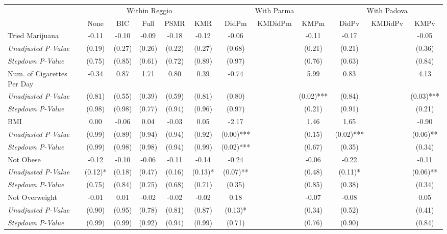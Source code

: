 \begin{tabular}{l c c c c c c c c c c c}
\toprule
& \multicolumn{5}{c}{Within Reggio} & \multicolumn{3}{c}{With Parma} & \multicolumn{3}{c}{With Padova} \\\cmidrule(lr){2-6} \cmidrule(lr){7-9} \cmidrule(lr){10-12}
 & None & BIC & Full & PSMR & KMR & DidPm & KMDidPm & KMPm & DidPv & KMDidPv & KMPv \\
\midrule
Tried Marijuana & -0.11 & -0.10 & -0.09 & -0.18 & -0.12 & -0.06 & & -0.11 & -0.17 & & -0.05 \\
\quad \textit{Unadjusted P-Value} & (0.19) & (0.27) & (0.26) & (0.22) & (0.27) & (0.68) & & (0.21) & (0.21) & & (0.36) \\
\quad \textit{Stepdown P-Value} & (0.75) & (0.85) & (0.61) & (0.72) & (0.89) & (0.97) & & (0.76) & (0.63) & & (0.84) \\
Num. of Cigarettes Per Day & -0.34 & 0.87 & 1.71 & 0.80 & 0.39 & -0.74 & & 5.99 & 0.83 & & 4.13 \\
\quad \textit{Unadjusted P-Value} & (0.81) & (0.55) & (0.39) & (0.59) & (0.81) & (0.80) & & (0.02)*** & (0.84) & & (0.03)*** \\
\quad \textit{Stepdown P-Value} & (0.98) & (0.98) & (0.77) & (0.94) & (0.96) & (0.97) & & (0.21) & (0.91) & & (0.21) \\
BMI & 0.00 & -0.06 & 0.04 & -0.03 & 0.05 & -2.17 & & 1.46 & 1.65 & & -0.90 \\
\quad \textit{Unadjusted P-Value} & (0.99) & (0.89) & (0.94) & (0.94) & (0.92) & (0.00)*** & & (0.15) & (0.02)*** & & (0.06)** \\
\quad \textit{Stepdown P-Value} & (0.99) & (0.98) & (0.98) & (0.94) & (0.99) & (0.02)*** & & (0.67) & (0.35) & & (0.34) \\
Not Obese & -0.12 & -0.10 & -0.06 & -0.11 & -0.14 & -0.24 & & -0.06 & -0.22 & & -0.11 \\
\quad \textit{Unadjusted P-Value} & (0.12)* & (0.18) & (0.47) & (0.16) & (0.13)* & (0.07)** & & (0.48) & (0.11)* & & (0.06)** \\
\quad \textit{Stepdown P-Value} & (0.75) & (0.84) & (0.75) & (0.68) & (0.71) & (0.35) & & (0.85) & (0.38) & & (0.34) \\
Not Overweight & -0.01 & 0.01 & -0.02 & -0.02 & -0.02 & 0.18 & & -0.07 & -0.08 & & 0.05 \\
\quad \textit{Unadjusted P-Value} & (0.90) & (0.95) & (0.78) & (0.81) & (0.87) & (0.13)* & & (0.34) & (0.52) & & (0.41) \\
\quad \textit{Stepdown P-Value} & (0.99) & (0.99) & (0.92) & (0.94) & (0.99) & (0.71) & & (0.76) & (0.90) & & (0.84) \\

\end{tabular}
